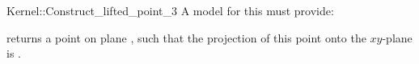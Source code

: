 \begin{ccRefFunctionObjectConcept}{Kernel::Construct_lifted_point_3}
A model for this must provide:


       {returns a point  on plane , such that the projection of
        this point onto the $xy$-plane is .}

\end{ccRefFunctionObjectConcept}
